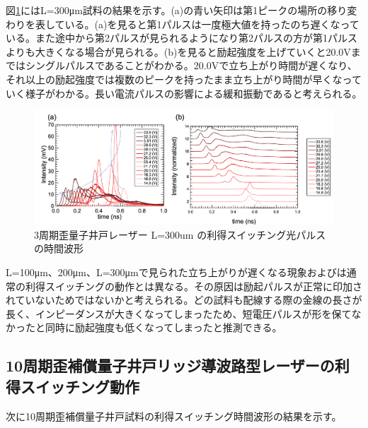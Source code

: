 {図\ref{fig:fig_3_2_3QW_ridge_L300_GS}にはL=300\si{\micro\metre}試料の結果を示す。(a)の青い矢印は第1ピークの場所の移り変わりを表している。(a)を見ると第1パルスは一度極大値を持ったのち遅くなっている。また途中から第2パルスが見られるようになり第2パルスの方が第1パルスよりも大きくなる場合が見られる。(b)を見ると励起強度を上げていくと20.0Vまではシングルパルスであることがわかる。20.0Vで立ち上がり時間が遅くなり、それ以上の励起強度では複数のピークを持ったまま立ち上がり時間が早くなっていく様子がわかる。長い電流パルスの影響による緩和振動であると考えられる。
\begin{figure}[h]
	\centering
	\includegraphics[width=15cm]{figure/fig_3_2_3QW_ridge_L300_GS.png}
		\caption{3周期歪量子井戸レーザー L=300um の利得スイッチング光パルスの時間波形}
		\label{fig:fig_3_2_3QW_ridge_L300_GS}
\end{figure}


L=100\si{\micro\metre}、200\si{\micro\metre}、L=300\si{\micro\metre}で見られた立ち上がりが遅くなる現象およびは通常の利得スイッチングの動作とは異なる。その原因は励起パルスが正常に印加されていないためではないかと考えられる。どの試料も配線する際の金線の長さが長く、インピーダンスが大きくなってしまったため、短電圧パルスが形を保てなかったと同時に励起強度も低くなってしまったと推測できる。
\clearpage
\subsection{10周期歪補償量子井戸リッジ導波路型レーザーの利得スイッチング動作}%
次に10周期歪補償量子井戸試料の利得スイッチング時間波形の結果を示す。

}
